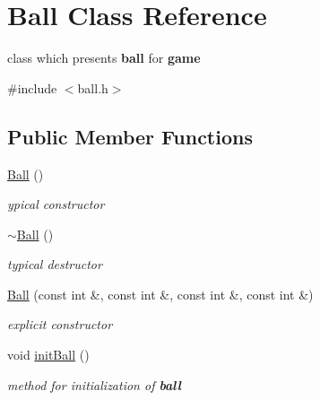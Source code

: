 \hypertarget{class_ball}{}\section{Ball Class Reference}
\label{class_ball}


class which presents {\bfseries{ball}} for {\bfseries{game}}  




{\ttfamily \#include $<$ball.\+h$>$}

\subsection*{Public Member Functions}
\begin{DoxyCompactItemize}
\item 
\mbox{\label{class_ball_a86a144d3dad6c953e422e32435923bbb}} 
\mbox{\hyperlink{class_ball_a86a144d3dad6c953e422e32435923bbb}{Ball}} ()
\begin{DoxyCompactList}\small\item\em ypical {\itshape constructor} \end{DoxyCompactList}\item 
\mbox{\label{class_ball_a20f2f6ac0bf648f406a8e12e63429fcd}} 
\mbox{\hyperlink{class_ball_a20f2f6ac0bf648f406a8e12e63429fcd}{$\sim$\+Ball}} ()
\begin{DoxyCompactList}\small\item\em typical {\itshape destructor} \end{DoxyCompactList}\item 
\mbox{\label{class_ball_a1e2c3b274aab291d7ec0cf5d4bbfa3f4}} 
\mbox{\hyperlink{class_ball_a1e2c3b274aab291d7ec0cf5d4bbfa3f4}{Ball}} (const int \&, const int \&, const int \&, const int \&)
\begin{DoxyCompactList}\small\item\em explicit {\itshape constructor} \end{DoxyCompactList}\item 
\mbox{\label{class_ball_a21bbaf8ffd75d588c74e0ac1b5a3e292}} 
void \mbox{\hyperlink{class_ball_a21bbaf8ffd75d588c74e0ac1b5a3e292}{init\+Ball}} ()
\begin{DoxyCompactList}\small\item\em {\itshape method} for initialization of {\bfseries{ball}} \end{DoxyCompactList}\item 

\end{DoxyCompactItemize}
